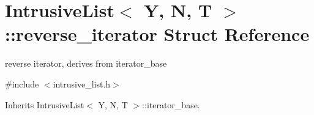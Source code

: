 \hypertarget{structIntrusiveList_1_1reverse__iterator}{}\section{Intrusive\+List$<$ Y, N, T $>$\+:\+:reverse\+\_\+iterator Struct Reference}
\label{structIntrusiveList_1_1reverse__iterator}


reverse iterator, derives from iterator\+\_\+base  




{\ttfamily \#include $<$intrusive\+\_\+list.\+h$>$}



Inherits Intrusive\+List$<$ Y, N, T $>$\+::iterator\+\_\+base.

